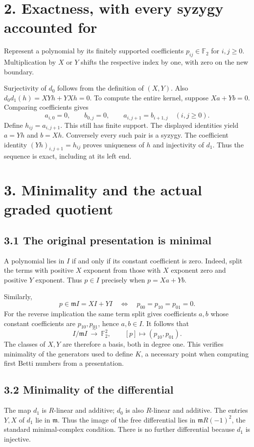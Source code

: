 \documentclass[11pt]{article}
\newcommand{\F}{\mathbb F_2}
\newcommand{\m}{\mathfrak m}
\begin{document}
\section*{2. Exactness, with every syzygy accounted for}
Represent a polynomial by its finitely supported coefficients
$p_{ij}\in\F$ for $i,j\ge0$. Multiplication by $X$ or $Y$ shifts the respective
index by one, with zero on the new boundary.

Surjectivity of $d_0$ follows from the definition of $(X,Y)$. Also
$d_0d_1(h)=XYh+YXh=0$. To compute the entire kernel, suppose $Xa+Yb=0$.
Comparing coefficients gives
\[
 a_{i,0}=0,\qquad b_{0,j}=0,\qquad
 a_{i,j+1}=b_{i+1,j}\quad(i,j\ge0).
\]
Define $h_{ij}=a_{i,j+1}$. This still has finite support. The displayed
identities yield $a=Yh$ and $b=Xh$. Conversely every such pair is a syzygy.
The coefficient identity $(Yh)_{i,j+1}=h_{ij}$ proves uniqueness of $h$ and
injectivity of $d_1$. Thus the sequence is exact, including at its left end.

\newpage
\section*{3. Minimality and the actual graded quotient}
\subsection*{3.1 The original presentation is minimal}
A polynomial lies in $I$ if and only if its constant coefficient is zero.
Indeed, split the terms with positive $X$ exponent from those with $X$ exponent
zero and positive $Y$ exponent. Thus $p\in I$ precisely when $p=Xa+Yb$.

Similarly,
\[
 p\in\m I=X I+Y I
 \quad\Longleftrightarrow\quad p_{00}=p_{10}=p_{01}=0.
\]
For the reverse implication the same term split gives coefficients $a,b$
whose constant coefficients are $p_{10},p_{01}$, hence $a,b\in I$.
It follows that
\[
 I/\m I\ \xrightarrow{\ \sim\ }\ \F^2,
 \qquad [p]\longmapsto(p_{10},p_{01}).
\]
The classes of $X,Y$ are therefore a basis, both in degree one. This verifies
minimality of the generators used to define $K$, a necessary point when
computing first Betti numbers from a presentation.

\subsection*{3.2 Minimality of the differential}
The map $d_1$ is $R$-linear and additive; $d_0$ is also $R$-linear and
additive. The entries $Y,X$ of $d_1$ lie in $\m$. Thus the image of the free differential
lies in $\m R(-1)^2$, the standard minimal-complex condition. There is no
further differential because $d_1$ is injective.
\end{document}
